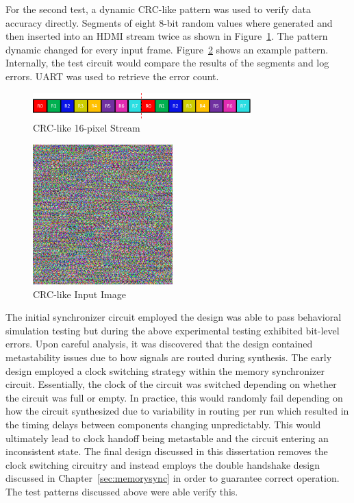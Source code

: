         For the second test, a dynamic CRC-like pattern was used to verify data accuracy directly. Segments of eight 8-bit random values where generated and then inserted into an HDMI stream twice as shown in Figure~\ref{fig:crc_like_buffer}. The pattern dynamic changed for every input frame. Figure~\ref{fig:random_noise} shows an example pattern. Internally, the test circuit would compare the results of the segments and log errors. UART was used to retrieve the error count.

        \begin{figure}[t]
            \centering
            \includegraphics[width=0.75\textwidth]{fig/crc_like_buffer.pdf}
            \caption{CRC-like 16-pixel Stream}
            \label{fig:crc_like_buffer}
        \end{figure}

        \begin{figure}[t]
            \centering
            \includegraphics{fig/random_noise.png}
            \caption{CRC-like Input Image}
            \label{fig:random_noise}
        \end{figure}

        The initial synchronizer circuit employed the design was able to pass behavioral simulation testing but during the above experimental testing exhibited bit-level errors. Upon careful analysis, it was discovered that the design contained metastability issues due to how signals are routed during synthesis. The early design employed a clock switching strategy within the memory synchronizer circuit. Essentially, the clock of the circuit was switched depending on whether the circuit was full or empty. In practice, this would randomly fail depending on how the circuit synthesized due to variability in routing per run which resulted in the timing delays between components changing unpredictably. This would ultimately lead to clock handoff being metastable and the circuit entering an inconsistent state. The final design discussed in this dissertation removes the clock switching circuitry and instead employs the double handshake design discussed in Chapter~\ref{sec:memorysync} in order to guarantee correct operation. The test patterns discussed above were able verify this.

